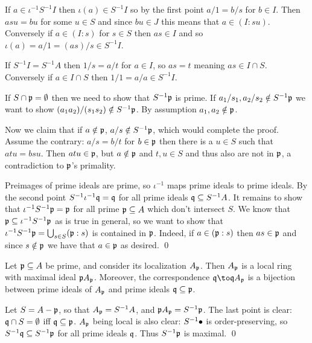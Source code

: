         \item If $a\in\iota^{-1}S^{-1}I$ then $\iota(a)\in S^{-1}I$ so by the first point $a/1=b/s$ for $b\in I$.
        Then $asu=bu$ for some $u\in S$ and since $bu\in J$ this means that $a\in(I:su)$.
        Conversely if $a\in(I:s)$ for $s\in S$ then $as\in I$ and so $\iota(a)=a/1=(as)/s\in S^{-1}I$.

        \item If $S^{-1}I=S^{-1}A$ then $1/s=a/t$ for $a\in I$, so $as=t$ meaning $as\in I\cap S$.
        Conversely if $a\in I\cap S$ then $1/1=a/a\in S^{-1}I$.

        \item If $S\cap{{\frak p}}=\emptyset$ then we need to show that $S^{-1}{{\frak p}}$ is prime.
        If $a_1/s_1,a_2/s_2\notin S^{-1}{{\frak p}}$ we want to show $(a_1a_2)/(s_1s_2)\notin S^{-1}{{\frak p}}$.
        By assumption $a_1,a_2\notin{{\frak p}}$.

        Now we claim that if $a\notin{{\frak p}}$, $a/s\notin S^{-1}{{\frak p}}$, which would complete the proof.
        Assume the contrary: $a/s=b/t$ for $b\in{{\frak p}}$ then there is a $u\in S$ such that $atu=bsu$.
        Then $atu\in{{\frak p}}$, but $a\notin{{\frak p}}$ and $t,u\in S$ and thus also are not in ${{\frak p}}$, a contradiction to ${{\frak p}}$'s primality.

        \item Preimages of prime ideals are prime, so $\iota^{-1}$ maps prime ideals to prime ideals.
        By the second point $S^{-1}\iota^{-1}{{\frak q}}={{\frak q}}$ for all prime ideals ${{\frak q}}\subseteq S^{-1}A$.
        It remains to show that $\iota^{-1}S^{-1}{{\frak p}}={{\frak p}}$ for all prime ${{\frak p}}\subseteq A$ which don't intersect $S$.
        We know that ${{\frak p}}\subseteq\iota^{-1}S^{-1}{{\frak p}}$ as is true in general, so we want to show that $\iota^{-1}S^{-1}{{\frak p}}=\bigcup_{s\in S}({{\frak p}}:s)$ is contained in ${{\frak p}}$.
        Indeed, if $a\in({{\frak p}}:s)$ then $as\in{{\frak p}}$ and since $s\notin{{\frak p}}$ we have that $a\in{{\frak p}}$ as desired.
        \qed
    \eenum

\eproof

\bcoro

    Let ${{\frak p}}\subseteq A$ be prime, and consider its localization $A_{{\frak p}}$.
    Then $A_{{\frak p}}$ is a local ring with maximal ideal ${{\frak p}} A_{{\frak p}}$.
    Moreover, the correspondence $\q\to\q A_\p$ is a bijection between prime ideals of $A_{{\frak p}}$ and prime ideals ${{\frak q}}\subseteq{{\frak p}}$.

\ecoro

\bproof

    Let $S=A-{{\frak p}}$, so that $A_{{\frak p}}=S^{-1}A$, and ${{\frak p}} A_{{\frak p}}=S^{-1}{{\frak p}}$.
    The last point is clear: ${{\frak q}}\cap S=\emptyset$ iff ${{\frak q}}\subseteq{{\frak p}}$.
    $A_{{\frak p}}$ being local is also clear: $S^{-1}\bullet$ is order-preserving, so $S^{-1}{{\frak q}}\subseteq S^{-1}{{\frak p}}$ for all prime ideals ${{\frak q}}$.
    Thus $S^{-1}{{\frak p}}$ is maximal.
    \qed

